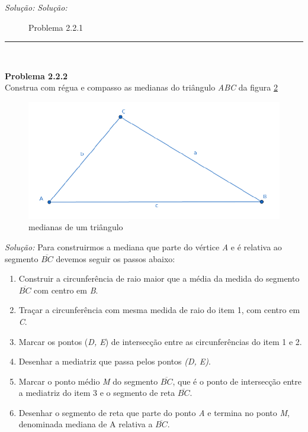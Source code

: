 \documentclass[a4paper, 11pt]{book}
\newenvironment{problem}[2][Problema] 
    { \begin{mdframed}[backgroundcolor=gray!20] \textbf{#1 #2} \\}
    {  \end{mdframed}}
\newenvironment{solution}
    {\textit{Solução:}}
    {}
\begin{document}
\begin{solution}
\begin{solution}
\begin{figure}[H]
        \caption{Problema 2.2.1}
        \label{fig:2.2.1r}
    \end{figure}
\end{solution}
\noindent\rule{7in}{2.8pt}\\

\begin{problem}{2.2.2}
    \label{prob:2.2.2}
    Construa com régua e compasso as medianas do triângulo \textit{ABC} da figura \ref{fig:2.2.2}
    \begin{figure}[H]
        \centering
        \includegraphics[scale=0.5]{imagens/2_2_2.png}
        \caption{medianas de um triângulo}
        \label{fig:2.2.2}
    \end{figure}
\end{problem}
\begin{solution}
    Para construirmos a mediana que parte do vértice \textit{A} e é relativa ao segmento $\overline{BC}$ devemos seguir os passos abaixo:
    \begin{enumerate}[\textbf{\arabic*}:]
        \item Construir a circunferência de raio maior que a média da medida do segmento $\overline{BC}$ com centro em \textit{B}. 
        \item Traçar a circunferência com mesma medida de raio do item 1, com centro em \textit{C}. 
        \item Marcar os pontos (\textit{D, E})  de intersecção entre as circunferências do item 1 e 2.
        \item Desenhar a mediatriz que passa pelos pontos \textit{(D, E)}. 
        \item Marcar o ponto médio \textit{M} do segmento  $\overline{BC}$, que é o ponto de intersecção entre a mediatriz do item 3 e o segmento de reta $\overline{BC}$. 
        \item Desenhar o segmento de reta que parte do ponto \textit{A} e termina no ponto \textit{M}, denominada mediana de A relativa a $\overline{BC}$. 

\end{enumerate}
\end{solution}
\end{solution}
\end{document}
